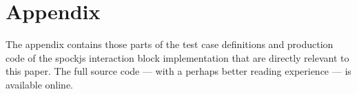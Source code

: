 \chapter*{Appendix}
\pagestyle{plain}

The appendix contains those parts
of the test case definitions and production code
of the spockjs interaction block implementation
that are directly relevant to this paper.
The full source code
--- with a perhaps better reading experience ---
is available online.
\autocite{SpockjsGithubDirectCompilation}
\autocite{SpockjsGithubRuntimeDispatch}




